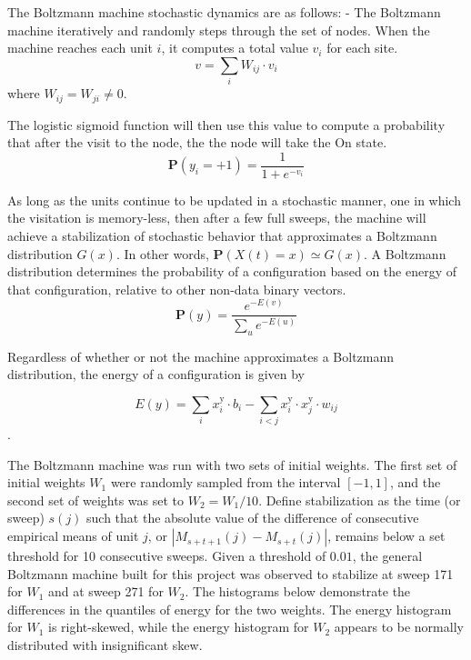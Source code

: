 \documentclass[11pt]{amsart}
\theoremstyle{remark}
\theoremstyle{remark}
\numberwithin{equation}{section}
\newcommand{\Prob}{\mathbf{P}}
\begin{document}
    The Boltzmann machine stochastic dynamics are as follows:
    - The Boltzmann machine iteratively and randomly steps through the set of 
    nodes. When the machine reaches each unit $i$, it computes a total value $v_i$ for
    each site. 
    \[
    	v = \sum_{i}{W_{ij}\cdot v_i}
    \]
    where $W_{ij} = W_{ji} \neq 0$. 
    
    The logistic sigmoid function will then use this value to compute a probability
    that after the visit to the node, the the node will take the On state. 
    \[
    	\Prob(y_i = +1) = \frac{1}{1 + e^{-v_i}}
    \]
    
    As long as the units continue to be updated in a stochastic manner, one in which
    the visitation is memory-less, then after a few full sweeps, the machine will achieve
    a stabilization of stochastic behavior that approximates a Boltzmann distribution 
    $G(x)$. In other words, $\Prob(X(t) = x) \simeq G(x)$. A Boltzmann distribution 
    determines the probability of a configuration based on the energy of that configuration,
    relative to other non-data binary vectors.
        \[
    	\Prob(y) = \frac{e^{-E(v)}}{\sum_u  e^{-E(u)}}
    \]
    
    Regardless of whether or not the machine approximates a Boltzmann 
    distribution, the energy of a configuration is given by
    
    \[
    	E(y) = \sum_i {x_i ^\text{y} \cdot b_i} - \sum_{i<j}{x_i ^\text{y} \cdot x_j ^\text{y} \cdot w_{ij}}
    \].    
	
	The Boltzmann machine was run with two sets of initial weights. The first set of 
	initial weights $W_1$ were randomly sampled from the interval $[-1, 1]$, and 
	the second set of weights was set to $W_2 = W_1 /10$.  Define stabilization 
	as the time (or sweep) $s(j)$ such that the absolute value of the difference of
	consecutive empirical means of unit $j$, or $|M_{s+t+1}(j) - M_{s+t}(j)|$, 
	remains below a set threshold for 10 consecutive sweeps. Given a threshold of 
	$0.01$, the general Boltzmann machine built for this project was observed to 
	stabilize at sweep 171 for $W_1$ and at sweep 271 for $W_2$.  The histograms 
	below demonstrate the differences in the quantiles of energy for the two weights. 
	The energy histogram for $W_1$ is right-skewed, while the energy histogram 
	for $W_2$ appears to be normally distributed with insignificant skew.
	
\end{document}
